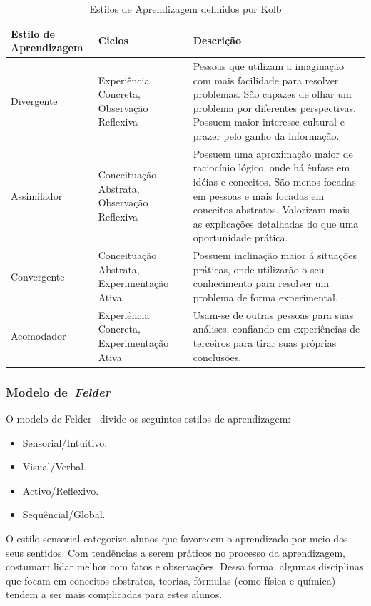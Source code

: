 \begin{table}
	\caption{Estilos de Aprendizagem definidos por Kolb}
	\begin{tabular}{|p{4cm} | p{3cm} | p{7cm} |}
		\hline
		\textbf{Estilo de Aprendizagem}	& \textbf{Ciclos} & \textbf{Descrição}	\\
		\hline
		Divergente	& Experiência Concreta, Observação Reflexiva & Pessoas que utilizam a imaginação com mais facilidade para resolver problemas. São capazes de olhar um problema por diferentes perspectivas. Possuem maior interesse cultural e prazer pelo ganho da informação. 	\\
		\hline
		Assimilador	& Conceituação Abstrata, Observação Reflexiva & Possuem uma aproximação maior de raciocínio lógico, onde há ênfase em idéias e conceitos. São menos focadas em pessoas e mais focadas em conceitos abstratos. Valorizam mais as explicações detalhadas do que uma oportunidade prática. 	\\
		\hline
		Convergente	& Conceituação Abstrata, Experimentação Ativa & Possuem inclinação maior á situações práticas, onde utilizarão o seu conhecimento para resolver um problema de forma experimental.	\\
		\hline
		Acomodador	& Experiência Concreta, Experimentação Ativa & Usam-se de outras pessoas para suas análises, confiando em experiências de terceiros para tirar suas próprias conclusões.	\\
		\hline
	\end{tabular}
	\label{lista_estilos_aprendizagem}
\end{table}

\subsubsection{Modelo de~\emph{Felder}}
O modelo de Felder~\cite{felder1988learning} divide os seguintes estilos de aprendizagem:
\begin{itemize}
	\item Sensorial/Intuitivo.
	\item Visual/Verbal.
	\item Activo/Reflexivo.
	\item Sequêncial/Global.
\end{itemize}

O estilo sensorial categoriza alunos que favorecem o aprendizado por meio dos seus sentidos. Com tendências a serem práticos no processo da aprendizagem, costumam lidar melhor com fatos e observações. Dessa forma, algumas disciplinas que focam em conceitos abstratos, teorias, fórmulas (como física e química) tendem a ser mais complicadas para estes alunos.

